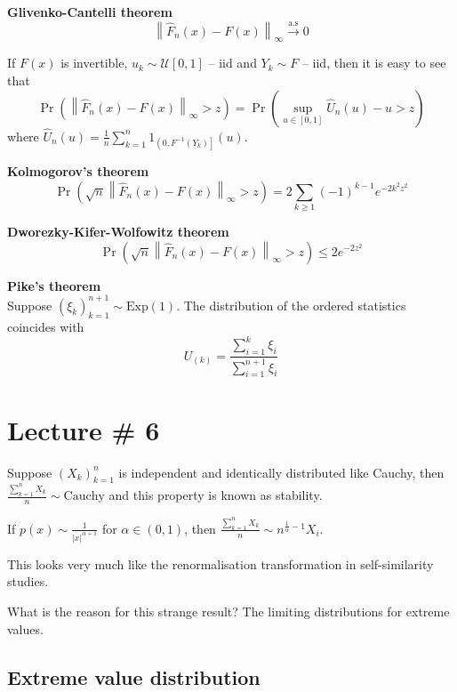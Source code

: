 \documentclass[a4paper]{article}
\newcommand{\clo}[1]{{\left [ #1 \right ]}}
\newcommand{\ploc}[1]{{\left ( #1 \right ]}}
\newcommand{\brac}[1]{{\left ( #1 \right )}}
\newcommand{\abs}[1]{{\left | #1 \right |}}
\newcommand{\nrm}[1]{{\left\| #1 \right \|}}
\begin{document}
\noindent\textbf{Glivenko-Cantelli theorem}\hfill\\
\[\nrm{\hat{F}_n(x) - F(x)}_\infty \overset{\text{a.s}}{\to} 0\]

If $F(x)$ is invertible, $u_k\sim\mathcal{U}\clo{0,1}$ -- iid and $Y_k\sim F$ -- iid, then it is easy to see that 
\[\Pr\brac{\nrm{\hat{F}_n(x) - F(x)}_\infty>z} = \Pr\brac{\sup_{u\in\clo{0,1}}{\hat{U}_n(u) - u}>z}\]
where $\hat{U}_n(u) = \frac{1}{n}\sum_{k=1}^n 1_\ploc{0,F^{-1}(Y_k)}(u)$.

\noindent\textbf{Kolmogorov's theorem}\hfill\\
\[\Pr\brac{\sqrt{n}\nrm{\hat{F}_n(x) - F(x)}_\infty>z} = 2\sum_{k\geq1} {(-1)}^{k-1} e^{-2k^2z^2}\]

\noindent\textbf{Dworezky-Kifer-Wolfowitz theorem}\hfill\\
\[\Pr\brac{\sqrt{n}\nrm{\hat{F}_n(x) - F(x)}_\infty>z} \leq 2 e^{-2z^2}\]

\noindent\textbf{Pike's theorem}\hfill\\
Suppose $\brac{\xi_k}_{k=1}^{n+1}\sim \text{Exp}(1)$.
The distribution of the ordered statistics coincides with 
\[U_{(k)} = \frac{\sum_{i=1}^k\xi_i}{\sum_{i=1}^{n+1}\xi_i}\]



\section{Lecture \# 6} %
\label{sec:lecture_6}

Suppose $\brac{X_k}_{k=1}^n$ is independent and identically distributed like Cauchy, then $\frac{\sum_{k=1}^n X_k}{n}\sim \text{Cauchy}$ and this property is known as stability.

If $p(x)\sim \frac{1}{\abs{x}^{\alpha+1}}$ for $\alpha\in\brac{0,1}$, then $\frac{\sum_{k=1}^n X_k}{n}\sim n^{\frac{1}{\alpha}-1} X_i$.

This looks very much like the renormalisation transformation in self-similarity studies.

What is the reason for this strange result? The limiting distributions for extreme values.

\subsection{Extreme value distribution} %
\label{sub:extreme_value_distribution}
\end{document}
